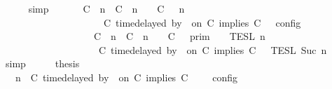 \begin{isabellebody}
\ \ \ \ \isamarkupfalse%
\ simp\isanewline
\ \ \isamarkupfalse%
\ \isamarkupfalse%
\ {\isacartoucheopen}{\isasymlbrakk}\ {\isacharparenleft}{\isacharparenleft}C\ {\isasymUp}\ n{\isacharparenright}\ {\isacharhash}\ {\isacharparenleft}C\ {\isacharat}\ n\ {\isasymoplus}\ {\isasymdelta}{\isasymtau}\ {\isasymRightarrow}\ C\ {\isacharhash}\ {\isasymGamma}{\isacharparenright}{\isacharcomma}\ n\isanewline
\ \ \ \ \ \ \ \ \ \ \ \ \ \ \ \ \ \ {\isasymTurnstile}\ {\isasymPsi}\ {\isasymtriangleright}\ {\isacharparenleft}{\isacharparenleft}C\ time{\isacharminus}delayed\ by\ {\isasymdelta}{\isasymtau}\ on\ C\ implies\ C\ {\isacharhash}\ {\isasymPhi}{\isacharparenright}\ {\isasymrbrakk}\isactrlsub c\isactrlsub o\isactrlsub n\isactrlsub f\isactrlsub i\isactrlsub g\isanewline
\ \ \ \ \ \ \ \ \ \ \ \ \ \ \ \ \ {\isacharequal}\ {\isasymlbrakk}{\isasymlbrakk}\ {\isacharparenleft}C\ {\isasymUp}\ n{\isacharparenright}\ {\isacharhash}\ {\isacharparenleft}C\ {\isacharat}\ n\ {\isasymoplus}\ {\isasymdelta}{\isasymtau}\ {\isasymRightarrow}\ C\ {\isacharhash}\ {\isasymGamma}\ {\isasymrbrakk}{\isasymrbrakk}\isactrlsub p\isactrlsub r\isactrlsub i\isactrlsub m\ {\isasyminter}\ {\isasymlbrakk}{\isasymlbrakk}\ {\isasymPsi}\ {\isasymrbrakk}{\isasymrbrakk}\isactrlsub T\isactrlsub E\isactrlsub S\isactrlsub L\isactrlbsup {\isasymge}\ n\isactrlesup \isanewline
\ \ \ \ \ \ \ \ \ \ \ \ \ \ \ \ \ \ {\isasyminter}\ {\isasymlbrakk}{\isasymlbrakk}\ {\isacharparenleft}C\ time{\isacharminus}delayed\ by\ {\isasymdelta}{\isasymtau}\ on\ C\ implies\ C\ {\isacharhash}\ {\isasymPhi}\ {\isasymrbrakk}{\isasymrbrakk}\isactrlsub T\isactrlsub E\isactrlsub S\isactrlsub L\isactrlbsup {\isasymge}\ Suc\ n\isactrlesup {\isacartoucheclose}\isanewline
\ \ \ \ \isamarkupfalse%
\ simp\isanewline
\ \ \isamarkupfalse%
\ \isamarkupfalse%
\ {\isacharquery}thesis\isanewline
\ \ \isamarkupfalse%
\ {\isacharminus}\isanewline
\ \ \ \ \isamarkupfalse%
\ {\isacartoucheopen}{\isasymlbrakk}\ {\isasymGamma}{\isacharcomma}\ n\ {\isasymTurnstile}\ {\isacharparenleft}C\ time{\isacharminus}delayed\ by\ {\isasymdelta}{\isasymtau}\ on\ C\ implies\ C\ {\isacharhash}\ {\isasymPsi}\ {\isasymtriangleright}\ {\isasymPhi}\ {\isasymrbrakk}\isactrlsub c\isactrlsub o\isactrlsub n\isactrlsub f\isactrlsub i\isactrlsub g\isanewline

\end{isabellebody}
